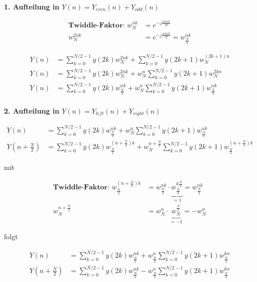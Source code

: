 \documentclass[10pt,a4paper]{article}
\begin{document}
\textbf{1. Aufteilung in $Y(n) = Y_{even}(n)+Y_{odd}(n)$}
\begin{mdframed}[style=exercise]
  \begin{align}
      \textbf{Twiddle-Faktor: } w_N^{nk}&=e^{-j\frac{2\pi nk}{N}}\\
      w_N^{2nk}&=e^{-j\frac{4\pi nk}{N}}=w_{\frac{N}{2}}^{nk}
  \end{align}
\end{mdframed}

  \begin{mdframed}[style=exercise,font=\scriptsize]
    \begin{align}
        Y(n)&=\sum_{k=0}^{N/2-1} y(2k)w_N^{2nk}+\sum_{k=0}^{N/2-1} y(2k+1)w_N^{(2k+1)n}\\
        Y(n)&=\sum_{k=0}^{N/2-1} y(2k)w_N^{2nk}+w_N^{n}\sum_{k=0}^{N/2-1} y(2k+1)w_N^{2kn}\\
        Y(n)&=\sum_{k=0}^{N/2-1} y(2k)w_{\frac{N}{2}}^{nk}+w_N^{n}\sum_{k=0}^{N/2-1} y(2k+1)w_{\frac{N}{2}}^{nk}\\
    \end{align}
  \end{mdframed}
\textbf{2. Aufteilung in $Y(n) = Y_{left}(n)+Y_{right}(n)$}
  \begin{mdframed}[style=exercise,font=\scriptsize]
    \begin{align}
        Y(n)&=\sum_{k=0}^{N/2-1} y(2k)w_{\frac{N}{2}}^{nk}+w_N^{n}\sum_{k=0}^{N/2-1} y(2k+1)w_{\frac{N}{2}}^{nk}\\
        Y(n+\frac{N}{2})&=\sum_{k=0}^{N/2-1} y(2k)w_{\frac{N}{2}}^{(n+\frac{N}{2})k}+w_N^{n+\frac{N}{2}}\sum_{k=0}^{N/2-1} y(2k+1)w_{\frac{N}{2}}^{(n+\frac{N}{2})k}
    \end{align}
  \end{mdframed}
mit 
  \begin{mdframed}[style=exercise]
    \begin{align}
      \textbf{Twiddle-Faktor: } w_{\frac{N}{2}}^{(n+\frac{N}{2})k} &= w_{\frac{N}{2}}^{nk} \cdot \underbrace{w_{\frac{N}{2}}^{k\frac{N}{2}}}_{=1} = w_{\frac{N}{2}}^{nk}\\
        w_N^{n+\frac{N}{2}} &= w_N^n \cdot \underbrace{w^{\frac{N}{2}}_N}_{=-1} = -w_N^n
    \end{align}
  \end{mdframed}
folgt 
  \begin{mdframed}[style=exercise,font=\scriptsize]
    \begin{align}
        Y(n)&=\sum_{k=0}^{N/2-1} y(2k) w_{\frac{N}{2}}^{nk} + w_{\frac{N}{2}}^{n} \sum_{k=0}^{N/2-1} y(2k+1)w_{\frac{N}{2}}^{kn}\\
        Y(n+\frac{N}{2})&=\sum_{k=0}^{N/2-1} y(2k) w_{\frac{N}{2}}^{nk} - w_{\frac{N}{2}}^{n} \sum_{k=0}^{N/2-1} y(2k+1)w_{\frac{N}{2}}^{kn}
    \end{align}
  \end{mdframed}
\end{document}
